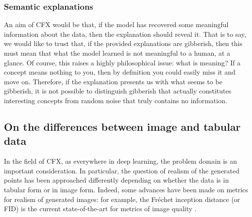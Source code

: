 \documentclass[../main.tex]{subfiles}
\begin{document}
\subsubsection{Semantic explanations}
\label{intro/semanticity_problem}



An aim of CFX would be that, if the model has recovered some meaningful information about the data, then the explanation should reveal it. That is to say, we would like to trust that, if the provided explanations are gibberish, then this must mean that what the model learned is not meaningful to a human, at a glance.
Of course, this raises a highly philosophical issue: what is meaning? 
If a concept means nothing to you, then by definition you could easily miss it and move on.
Therefore, if the explanation presents us with what seems to be gibberish, it is not possible to distinguish gibberish that actually constitutes interesting concepts from random noise that truly contains no information.

\subsection{On the differences between image and tabular data}
\label{intro/image_data}

In the field of CFX, as everywhere in deep learning, the problem domain is an important consideration.
In particular, the question of realism of the generated points has been approached differently depending on whether the data is in tabular form or in image form.
Indeed, some advances have been made on metrics for realism of generated images: for example, the Fréchet inception distance (or FID) is the current state-of-the-art for metrics of image quality \cite{heuselGANs2017}.

\end{document}
